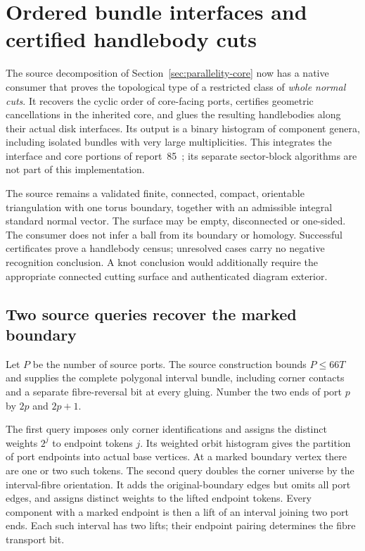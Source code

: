 \section{Ordered bundle interfaces and certified handlebody cuts}
\label{sec:marked-cut-handlebodies}

The source decomposition of Section~\ref{sec:parallelity-core} now has a
native consumer that proves the topological type of a restricted class of
\emph{whole normal cuts}. It recovers the cyclic order of core-facing ports,
certifies geometric cancellations in the inherited core, and glues the
resulting handlebodies along their actual disk interfaces. Its output is a
binary histogram of component genera, including isolated bundles with very
large multiplicities. This integrates the interface and core portions of
report~85~\cite{marked-parallelity-report85}; its separate sector-block
algorithms are not part of this implementation.

The source remains a validated finite, connected, compact, orientable
triangulation with one torus boundary, together with an admissible integral
standard normal vector. The surface may be empty, disconnected or one-sided.
The consumer does not infer a ball from its boundary or homology. Successful
certificates prove a handlebody census; unresolved cases carry no negative
recognition conclusion. A knot conclusion would additionally require the
appropriate connected cutting surface and authenticated diagram exterior.

\subsection{Two source queries recover the marked boundary}

Let $P$ be the number of source ports. The source construction bounds
$P\le66T$ and supplies the complete polygonal interval bundle, including
corner contacts and a separate fibre-reversal bit at every gluing. Number
the two ends of port $p$ by $2p$ and $2p+1$.

The first query imposes only corner identifications and assigns the distinct
weights $2^j$ to endpoint tokens $j$. Its weighted orbit histogram gives the
partition of port endpoints into actual base vertices. At a marked boundary
vertex there are one or two such tokens. The second query doubles the corner
universe by the interval-fibre orientation. It adds the original-boundary
edges but omits all port edges, and assigns distinct weights to the lifted
endpoint tokens. Every component with a marked endpoint is then a lift of
an interval joining two port ends. Each such interval has two lifts; their
endpoint pairing determines the fibre transport bit.

